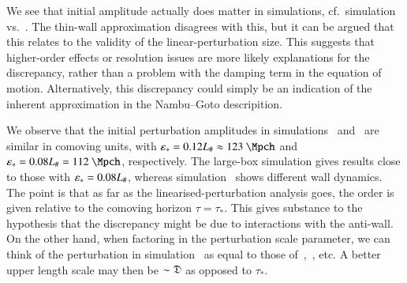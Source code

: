 We see that initial amplitude actually does matter in simulations, cf.~simulation  vs.~. The thin-wall approximation disagrees with this, but it can be argued that this relates to the validity of the linear-perturbation size. %
This suggests that higher-order effects or resolution issues are more likely explanations for the discrepancy, rather than a problem with the damping term in the equation of motion. Alternatively, this discrepancy could simply be an indication of the inherent approximation in the Nambu--Goto descripition.



We observe that the initial perturbation amplitudes in simulations~ and~ are similar in comoving units, with $\epsast =0.12L_\#\approx 123~\Mpch$ and $ \epsast =0.08L_\# = 112~ \Mpch$, respectively. The large-box simulation gives results close to those with $\varepsilon_\ast =0.08L_\#$, whereas simulation~ shows different wall dynamics. The point is that as far as the linearised-perturbation analysis goes, the order is given relative to the comoving horizon $\tau=\tau_\ast$. This gives substance to the hypothesis that the discrepancy might be due to interactions with the anti-wall. On the other hand, when factoring in the perturbation scale parameter, we can think of the perturbation in simulation~ as equal to those of~,~, etc. A better upper length scale may then be $\sim \mathfrak{D}$ as opposed to $\tau_\ast$.

    
    


